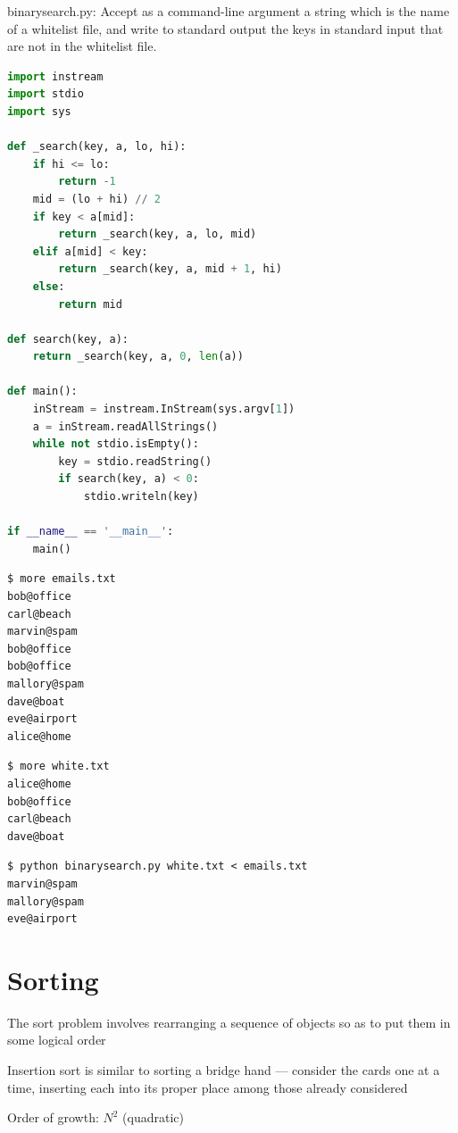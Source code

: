 \documentclass[8pt,a4paper,compress]{beamer}
\begin{document}
\begin{frame}[fragile]
\pause

\begin{framed}
\tiny binarysearch.py: Accept as a command-line argument a string which is the name of a whitelist file, and write to standard output the keys in standard input that are not in the whitelist file.
\end{framed}

\begin{lstlisting}[language=Python]
import instream
import stdio
import sys

def _search(key, a, lo, hi):
    if hi <= lo:
        return -1
    mid = (lo + hi) // 2
    if key < a[mid]:
        return _search(key, a, lo, mid)
    elif a[mid] < key:
        return _search(key, a, mid + 1, hi)
    else:
        return mid

def search(key, a):
    return _search(key, a, 0, len(a))

def main():
    inStream = instream.InStream(sys.argv[1])
    a = inStream.readAllStrings()
    while not stdio.isEmpty():
        key = stdio.readString()
        if search(key, a) < 0:
            stdio.writeln(key)

if __name__ == '__main__':
    main()
\end{lstlisting}
\end{frame}

\begin{frame}[fragile]
\pause

\begin{lstlisting}[language={}]
$ more emails.txt 
bob@office
carl@beach
marvin@spam
bob@office
bob@office
mallory@spam
dave@boat
eve@airport
alice@home
\end{lstlisting}

\pause

\begin{lstlisting}[language={}]
$ more white.txt
alice@home
bob@office
carl@beach
dave@boat
\end{lstlisting}

\pause

\begin{lstlisting}[language={}]
$ python binarysearch.py white.txt < emails.txt 
marvin@spam
mallory@spam
eve@airport
\end{lstlisting}
\end{frame}

\section{Sorting}
\begin{frame}[fragile]
\pause

The sort problem involves rearranging a sequence of objects so as to put them in some logical order

\pause
\bigskip

Insertion sort is similar to sorting a bridge hand --- consider the cards one at a time, inserting each into its proper place among those already considered

\pause
\bigskip

Order of growth: $N^2$ (quadratic)
\end{frame}
\end{document}
